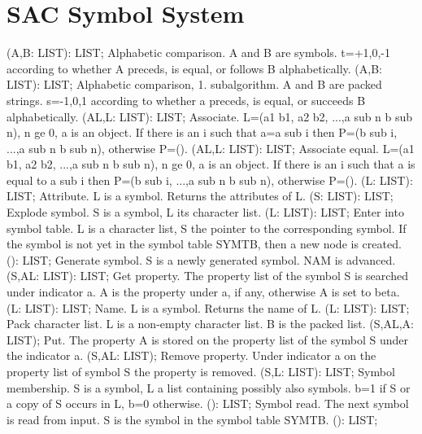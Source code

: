 \section{ SAC Symbol System  } 
 (A,B: LIST): LIST; \eproc
\bcom Alphabetic comparison. A and B are symbols. t=+1,0,-1 according
to whether A preceds, is equal, or follows B alphabetically. \ecom 
{} (A,B: LIST): LIST; \eproc
\bcom Alphabetic comparison, 1. subalgorithm. A and B are packed strings.
s=-1,0,1 according to whether a preceds, is equal, or succeeds B
alphabetically. \ecom 
{} (AL,L: LIST): LIST; \eproc
\bcom Associate. L=(a1 b1, a2 b2, ...,a sub n b sub n), n ge 0,
a is an object. If there is an i such that a=a sub i then
P=(b sub i, ...,a sub n b sub n), otherwise P=(). \ecom 
{} (AL,L: LIST): LIST; \eproc
\bcom Associate equal. L=(a1 b1, a2 b2, ...,a sub n b sub n), n ge 0,
a is an object. If there is an i such that a is equal to a sub i then
P=(b sub i, ...,a sub n b sub n), otherwise P=(). \ecom 
{} (L: LIST): LIST; \eproc
\bcom Attribute. L is a symbol. Returns the attributes of L. \ecom 
{} (S: LIST): LIST; \eproc
\bcom Explode symbol. S is a symbol, L its character list. \ecom 
{} (L: LIST): LIST; \eproc
\bcom Enter into symbol table. L is a character list, S the pointer
to the corresponding symbol. If the symbol is not yet in the
symbol table SYMTB, then a new node is created. \ecom 
{} (): LIST; \eproc
\bcom Generate symbol. S is a newly generated symbol. NAM is advanced. \ecom 
{} (S,AL: LIST): LIST; \eproc
\bcom Get property. The property list of the symbol S is searched
under indicator a. A is the property under a, if any, otherwise
A is set to beta. \ecom 
{} (L: LIST): LIST; \eproc
\bcom Name. L is a symbol. Returns the name of L. \ecom 
{} (L: LIST): LIST; \eproc
\bcom Pack character list. L is a non-empty character list. B is the
packed list. \ecom 
{} (S,AL,A: LIST); \eproc
\bcom Put. The property A is stored on the property list of
the symbol S under the indicator a. \ecom 
{} (S,AL: LIST); \eproc
\bcom Remove property. Under indicator a on the property list of
symbol S the property is removed. \ecom 
{} (S,L: LIST): LIST; \eproc
\bcom Symbol membership. S is a symbol, L a list containing possibly
also symbols. b=1 if S or a copy of S occurs in L, b=0 otherwise. \ecom 
{} (): LIST; \eproc
\bcom Symbol read. The next symbol is read from input. S is the symbol in
the symbol table SYMTB. \ecom 
{} (): LIST; \eproc
